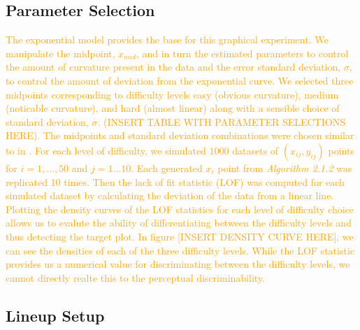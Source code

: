 \documentclass[]{interact}
\theoremstyle{plain}%
\theoremstyle{definition}
\theoremstyle{remark}
\begin{document}
\hypertarget{parameter-selection}{%
\subsection{Parameter Selection}\label{parameter-selection}}

\textcolor{Orange}{
The exponential model provides the base for this graphical experiment. 
We manipulate the midpoint, $x_{mid}$, and in turn the estimated parameters to control the amount of curvature present in the data and the error standard deviation, $\sigma$, to control the amount of deviation from the exponential curve.
We selected three midpoints corresponding to difficulty levels easy (obvious curvature), medium (noticable curvature), and hard (almost linear) along with a sensible choice of standard deviation, $\sigma.$ (INSERT TABLE WITH PARAMETER SELECTIONS HERE). 
The midpoints and standard deviation combinations were chosen similar to in \cite{vanderplas_clusters_2017}. 
For each level of difficulty, we simulated 1000 datasets of $(x_{ij}, y_{ij})$ points for $i = 1,...,50$ and $j = 1...10$. 
Each generated $x_i$ point from \textit{Algorithm 2.1.2} was replicated 10 times.  
Then the lack of fit statistic (LOF) was computed for each simulated dataset by calculating the deviation of the data from a linear line. 
Plotting the density curves of the LOF statistics for each level of difficulty choice allows us to evalute the ability of differentiating between the difficulty levels and thus detecting the target plot.
In figure [INSERT DENSITY CURVE HERE], we can see the densities of each of the three difficulty levels. 
While the LOF statistic provides us a numerical value for discriminating between the difficulty levels, we cannot directly realte this to the perceptual discriminability. 
}

\hypertarget{lineup-setup}{%
\subsection{Lineup Setup}\label{lineup-setup}}
\end{document}
